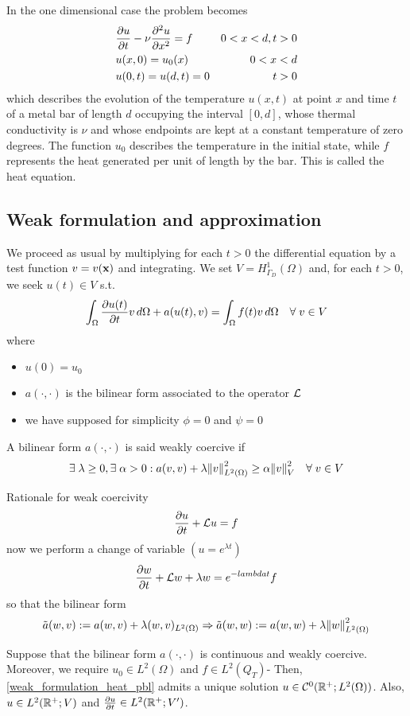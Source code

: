 In the one dimensional case the problem becomes 
\begin{equation}
    \begin{aligned}
        &\partialderivative{u}{t} - \nu \partialderivative{^2u}{x^2} = f & 0 < x <d, t> 0 \\
        &u(x,0) = u_0(x) & 0 < x < d \\
        & u(0,t) = u(d,t) = 0 & t>0
    \end{aligned}
    \label{one_dim_pbl}
\end{equation}
which describes the evolution of the temperature \(u(x,t)\) at point \(x\) and time \(t\) of a metal bar of length \(d\) occupying the interval \([0,d]\), whose thermal conductivity is \(\nu\) and whose endpoints are kept at a constant temperature of zero degrees. The function \(u_0\) describes the temperature in the initial state, while \(f\) represents the heat generated per unit of length by the bar. This is called the heat equation.
\subsection{Weak formulation and approximation}
We proceed as usual by multiplying for each \(t>0\) the differential equation by a test function \(v = v(\textbf{x})\) and integrating. We set \(V = H^1_{\Gamma_D}(\Omega)\) and, for each \(t>0\), we seek \(u(t)\in V\) s.t. 
\begin{equation}
    \int_{\Omega} \partialderivative{u(t)}{t} v \, d\Omega + a(u(t), v) = \int_\Omega f(t)v \, d\Omega \quad \forall \; v \in V 
    \label{weak_formulation_heat_pbl}
\end{equation}
where 
\begin{itemize}
    \item \(u(0) = u_0\)
    \item \(a(\cdot,\cdot)\) is the bilinear form associated to the operator \(\mathcal{L}\)
    \item we have supposed for simplicity \(\phi=0\) and \(\psi=0\)
\end{itemize}
\begin{definition}
    A bilinear form \(a(\cdot, \cdot)\) is said weakly coercive if 
    \[
        \exists \; \lambda \geq 0, \exists \; \alpha > 0 : a(v,v) + \lambda \norm{v}^2_{L^2(\Omega)} \geq \alpha \norm{v}^2_V \quad \forall \; v \in V
    \]
\end{definition}
Rationale for weak coercivity 
\[
    \partialderivative{u}{t} +\loperator u = f 
\]
now we perform a change of variable \((u = e^{\lambda t})\)
\[
    \partialderivative{w}{t} + \loperator w + \lambda w = e^{-lambda t} f
\]
so that the bilinear form 
\[
    \tilde{a}(w,v) := a(w,v)+\lambda(w,v)_{L^2(\Omega)} \Rightarrow \tilde{a}(w,w) := a(w,w) + \lambda \norm{w}_{L^2(\Omega)}^2
\]
\begin{theorem}
    Suppose that the bilinear form \(a(\cdot,\cdot)\) is continuous and weakly coercive. Moreover, we require \(u_0 \in L^2(\Omega)\) and \(f \in L^2(Q_T)\)- Then, \eqref{weak_formulation_heat_pbl} admits a unique solution \(u \in \mathcal{C}^0 (\mathbb{R}^+;L^2(\Omega))\). Also, \(u \in L^2(\mathbb{R}^+;V)\) and \(\partialderivative{u}{t} \in L^2(\real^+; V')\).
\end{theorem}
